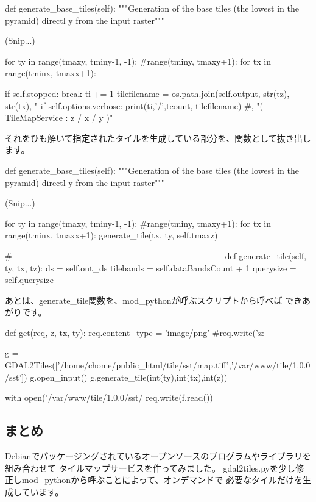 \documentclass[mingoth,a4paper]{jsarticle}
\begin{document}
\begin{commandline}
     def generate_base_tiles(self):
         """Generation of the base tiles (the lowest in the pyramid) directl y from the input raster"""

                               (Snip...)

         for ty in range(tmaxy, tminy-1, -1): #range(tminy, tmaxy+1):
             for tx in range(tminx, tmaxx+1):
 
                 if self.stopped:
                     break
                 ti += 1
                 tilefilename = os.path.join(self.output, str(tz), str(tx), "%
                 if self.options.verbose:
                     print(ti,'/',tcount, tilefilename) #, "( TileMapService     : z / x / y )"
\end{commandline}

それをひも解いて指定されたタイルを生成している部分を、関数として抜き出します。
\begin{commandline}
     def generate_base_tiles(self):
         """Generation of the base tiles (the lowest in the pyramid) directl y from the input raster"""

                               (Snip...)

         for ty in range(tmaxy, tminy-1, -1): #range(tminy, tmaxy+1):
             for tx in range(tminx, tmaxx+1):
                 generate_tile(tx, ty, self.tmaxz)
 
     # -------------------------------------------------------------------------
     def generate_tile(self, ty, tx, tz):
         ds = self.out_ds
         tilebands = self.dataBandsCount + 1
         querysize = self.querysize
\end{commandline}

あとは、generate\_tile関数を、mod\_pythonが呼ぶスクリプトから呼べば
できあがりです。
\begin{commandline}
def get(req, z, tx, ty):
        req.content_type = 'image/png'
        #req.write('z: %

        g = GDAL2Tiles(['/home/chome/public_html/tile/sst/map.tiff','/var/www/tile/1.0.0/sst'])
        g.open_input()
        g.generate_tile(int(ty),int(tx),int(z))

        with open('/var/www/tile/1.0.0/sst/%
                req.write(f.read())
\end{commandline}

\subsection{まとめ}
Debianでパッケージングされているオープンソースのプログラムやライブラリを組み合わせて
タイルマップサービスを作ってみました。
gdal2tiles.pyを少し修正しmod\_pythonから呼ぶことによって、オンデマンドで
必要なタイルだけを生成しています。
\end{document}
